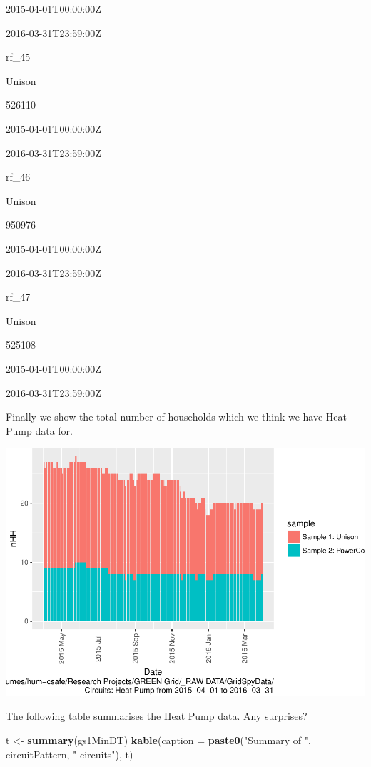\documentclass[]{article}
\newenvironment{Shaded}{\begin{snugshade}}{\end{snugshade}}
\newcommand{\KeywordTok}[1]{\textcolor[rgb]{0.13,0.29,0.53}{\textbf{#1}}}
\newcommand{\DataTypeTok}[1]{\textcolor[rgb]{0.13,0.29,0.53}{#1}}
\newcommand{\StringTok}[1]{\textcolor[rgb]{0.31,0.60,0.02}{#1}}
\newcommand{\NormalTok}[1]{#1}
\begin{document}
2015-04-01T00:00:00Z

2016-03-31T23:59:00Z

rf\_45

Unison

526110

2015-04-01T00:00:00Z

2016-03-31T23:59:00Z

rf\_46

Unison

950976

2015-04-01T00:00:00Z

2016-03-31T23:59:00Z

rf\_47

Unison

525108

2015-04-01T00:00:00Z

2016-03-31T23:59:00Z

Finally we show the total number of households which we think we have
Heat Pump data for.

\includegraphics{nzGGHouseholdPowerDemandProfile_Heat Pump_2015-04-01_2016-03-31_files/figure-latex/liveDataHouseholds-1.pdf}

The following table summarises the Heat Pump data. Any surprises?

\begin{Shaded}
\begin{Highlighting}[]
\NormalTok{t <-}\StringTok{ }\KeywordTok{summary}\NormalTok{(gs1MinDT)}
\KeywordTok{kable}\NormalTok{(}\DataTypeTok{caption =} \KeywordTok{paste0}\NormalTok{(}\StringTok{"Summary of "}\NormalTok{, circuitPattern, }\StringTok{" circuits"}\NormalTok{), t)}
\end{Highlighting}
\end{Shaded}
\end{document}
